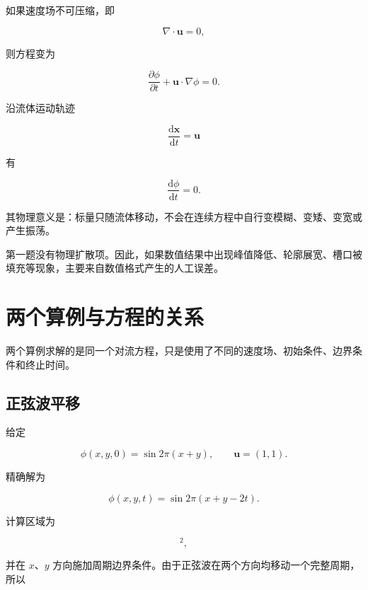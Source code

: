 \documentclass[UTF8,12pt,a4paper,fontset=fandol]{ctexart}
\begin{document}
如果速度场不可压缩，即

\begin{equation}
\nabla\cdot\bm u=0,
\end{equation}

则方程变为

\begin{equation}
\frac{\partial\phi}{\partial t}
+\bm u\cdot\nabla\phi=0.
\end{equation}

沿流体运动轨迹

\begin{equation}
\frac{\mathrm d\bm x}{\mathrm dt}=\bm u
\end{equation}

有

\begin{equation}
\frac{\mathrm d\phi}{\mathrm dt}=0.
\end{equation}

其物理意义是：标量只随流体移动，不会在连续方程中自行变模糊、变矮、变宽或产生振荡。

第一题没有物理扩散项。因此，如果数值结果中出现峰值降低、轮廓展宽、槽口被填充等现象，主要来自数值格式产生的人工误差。

\section{两个算例与方程的关系}

两个算例求解的是同一个对流方程，只是使用了不同的速度场、初始条件、边界条件和终止时间。

\subsection{正弦波平移}

给定

\begin{equation}
\phi(x,y,0)=\sin 2\pi(x+y),
\qquad
\bm u=(1,1).
\end{equation}

精确解为

\begin{equation}
\phi(x,y,t)
=
\sin 2\pi(x+y-2t).
\end{equation}

计算区域为

\begin{equation}
[0,1]^2,
\end{equation}

并在 $x$、$y$ 方向施加周期边界条件。由于正弦波在两个方向均移动一个完整周期，所以
\end{document}
